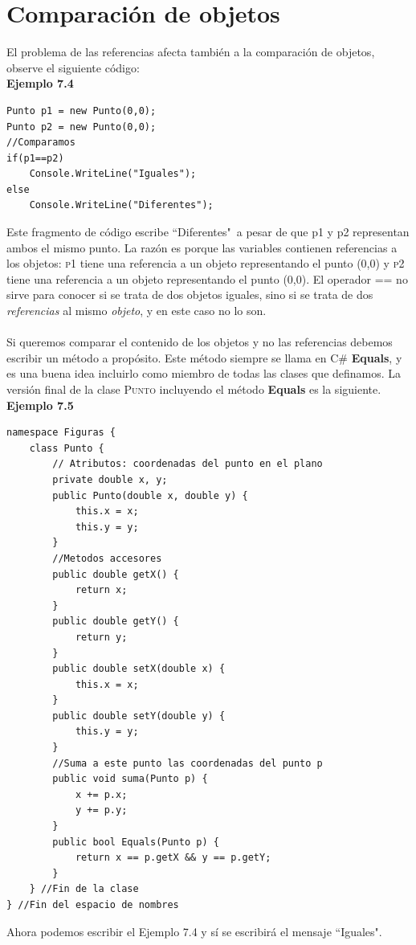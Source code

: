 \documentclass[12pt,a4paper]{report}
\begin{document}
\section{Comparación de objetos}
El problema de las referencias afecta también a la comparación de objetos, observe el siguiente código:\\\textbf{Ejemplo 7.4}
\begin{lstlisting}
Punto p1 = new Punto(0,0);
Punto p2 = new Punto(0,0);
//Comparamos
if(p1==p2)
	Console.WriteLine("Iguales");
else
	Console.WriteLine("Diferentes");
\end{lstlisting}Este fragmento de código escribe ``Diferentes"\ a pesar de que p1 y p2 representan ambos el mismo punto. La razón es porque las variables contienen referencias a los objetos: \textsc{p1} tiene una referencia a un objeto representando el punto (0,0) y \textsc{p2} tiene una referencia a un objeto representando el punto (0,0). El operador == no sirve para conocer si se trata de dos objetos iguales, sino si se trata de dos \textit{referencias} al mismo \textit{objeto}, y en este caso no lo son.\\\\Si queremos comparar el contenido de los objetos y no las referencias debemos escribir un método a propósito. Este método siempre se llama en C\# \textbf{Equals}, y es una buena idea incluirlo como miembro de todas las clases que definamos. La versión final de la clase \textsc{Punto} incluyendo el método \textbf{Equals} es la siguiente.\\\textbf{Ejemplo 7.5}
\begin{lstlisting}
namespace Figuras {
	class Punto {
		// Atributos: coordenadas del punto en el plano
		private double x, y;
		public Punto(double x, double y) {
			this.x = x;
			this.y = y;		
		}
		//Metodos accesores
		public double getX() {
			return x;
		}
		public double getY() {
			return y;
		}
		public double setX(double x) {
			this.x = x;
		}
		public double setY(double y) {
			this.y = y;
		}
		//Suma a este punto las coordenadas del punto p
		public void suma(Punto p) {
			x += p.x;
			y += p.y;		
		}
		public bool Equals(Punto p) {
			return x == p.getX && y == p.getY;		
		} 
	} //Fin de la clase
} //Fin del espacio de nombres
\end{lstlisting}Ahora podemos escribir el Ejemplo 7.4 y sí se escribirá el mensaje ``Iguales".
\end{document}
